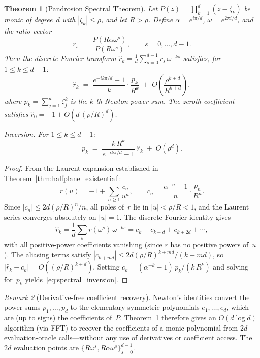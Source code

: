 \documentclass[10pt,a4paper,oneside]{book}
\newtheorem{theorem}{Theorem}[chapter]
\theoremstyle{definition}
\theoremstyle{remark}
\newtheorem{remark}[theorem]{Remark}
\begin{document}
\begin{theorem}[Pandrosion Spectral Theorem]
\label{thm:pandrosion_spectral}
Let $P(z) = \prod_{k=1}^d(z - \zeta_k)$ be monic of degree~$d$ with $|\zeta_k| \leq \rho$, and let $R > \rho$.  Define $\alpha = e^{i\pi/d}$, $\omega = e^{2\pi i/d}$, and the \emph{ratio vector}
\[
  r_s \;=\; \frac{P(R\alpha\omega^s)}{P(R\omega^s)}, \qquad s = 0, \ldots, d-1.
\]
Then the discrete Fourier transform $\hat{r}_k = \tfrac{1}{d}\sum_{s=0}^{d-1} r_s\,\omega^{-ks}$ satisfies, for $1 \leq k \leq d-1$:
\begin{equation}
\label{eq:spectral}
  \hat{r}_k \;=\; \frac{e^{-ik\pi/d} - 1}{k} \cdot \frac{p_k}{R^k}
  \;+\; O\!\left(\frac{\rho^{k+d}}{R^{k+d}}\right),
\end{equation}
where $p_k = \sum_{j=1}^d \zeta_j^k$ is the $k$-th Newton power sum.  The zeroth coefficient satisfies $\hat{r}_0 = -1 + O(d\,(\rho/R)^d)$.

\emph{Inversion.}  For $1 \leq k \leq d-1$:
\begin{equation}
\label{eq:spectral_inversion}
  p_k \;=\; \frac{k\,R^k}{e^{-ik\pi/d} - 1}\;\hat{r}_k
  \;+\; O(\rho^d).
\end{equation}
\end{theorem}

\begin{proof}
From the Laurent expansion established in Theorem~\ref{thm:halfplane_existential}:
\[
  r(u) = -1 + \sum_{n \geq 1} \frac{c_n}{u^n},
  \qquad c_n = \frac{\alpha^{-n} - 1}{n}\cdot\frac{p_n}{R^n}.
\]
Since $|c_n| \leq 2d(\rho/R)^n/n$, all poles of~$r$ lie in $|u| < \rho/R < 1$, and the Laurent series converges absolutely on $|u| = 1$.  The discrete Fourier identity gives
\[
  \hat{r}_k = \frac{1}{d}\sum_{s} r(\omega^s)\,\omega^{-ks}
  = c_k + c_{k+d} + c_{k+2d} + \cdots,
\]
with all positive-power coefficients vanishing (since $r$ has no positive powers of~$u$).  The aliasing terms satisfy $|c_{k+md}| \leq 2d(\rho/R)^{k+md}/(k+md)$, so $|\hat{r}_k - c_k| = O((\rho/R)^{k+d})$.  Setting $c_k = (\alpha^{-k}-1)\,p_k/(k\,R^k)$ and solving for~$p_k$ yields~\eqref{eq:spectral_inversion}.
\end{proof}

\begin{remark}[Derivative-free coefficient recovery]
\label{rem:coefficient_recovery}
Newton's identities convert the power sums $p_1, \ldots, p_d$ to the elementary symmetric polynomials $e_1, \ldots, e_d$, which are (up to signs) the coefficients of~$P$.  Theorem~\ref{thm:pandrosion_spectral} therefore gives an $O(d\log d)$ algorithm (via FFT) to recover the coefficients of a monic polynomial from $2d$ evaluation-oracle calls---without any use of derivatives or coefficient access.  The $2d$ evaluation points are $\{R\omega^s, R\alpha\omega^s\}_{s=0}^{d-1}$.
\end{remark}
\end{document}
